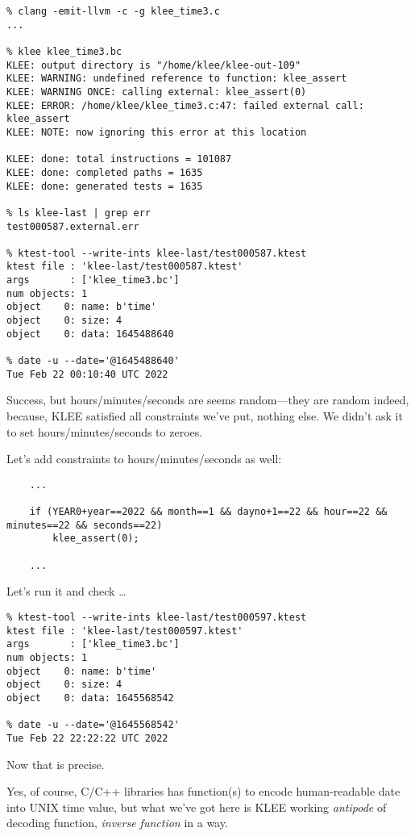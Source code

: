 

\begin{lstlisting}
% clang -emit-llvm -c -g klee_time3.c
...

% klee klee_time3.bc
KLEE: output directory is "/home/klee/klee-out-109"
KLEE: WARNING: undefined reference to function: klee_assert
KLEE: WARNING ONCE: calling external: klee_assert(0)
KLEE: ERROR: /home/klee/klee_time3.c:47: failed external call: klee_assert
KLEE: NOTE: now ignoring this error at this location

KLEE: done: total instructions = 101087
KLEE: done: completed paths = 1635
KLEE: done: generated tests = 1635

% ls klee-last | grep err
test000587.external.err

% ktest-tool --write-ints klee-last/test000587.ktest
ktest file : 'klee-last/test000587.ktest'
args       : ['klee_time3.bc']
num objects: 1
object    0: name: b'time'
object    0: size: 4
object    0: data: 1645488640

% date -u --date='@1645488640'
Tue Feb 22 00:10:40 UTC 2022
\end{lstlisting}

Success, but hours/minutes/seconds are seems random---they are random indeed, because, KLEE satisfied all constraints we've put, nothing else.
We didn't ask it to set hours/minutes/seconds to zeroes.

Let's add constraints to hours/minutes/seconds as well:

\begin{lstlisting}
	...

	if (YEAR0+year==2022 && month==1 && dayno+1==22 && hour==22 && minutes==22 && seconds==22)
		klee_assert(0);
	
	...
\end{lstlisting}

Let's run it and check \dots

\begin{lstlisting}
% ktest-tool --write-ints klee-last/test000597.ktest
ktest file : 'klee-last/test000597.ktest'
args       : ['klee_time3.bc']
num objects: 1
object    0: name: b'time'
object    0: size: 4
object    0: data: 1645568542

% date -u --date='@1645568542'
Tue Feb 22 22:22:22 UTC 2022
\end{lstlisting}

Now that is precise.

Yes, of course, C/C++ libraries has function(s) to encode human-readable date into UNIX time value, but what we've got here is KLEE working
\emph{antipode} of decoding function, \emph{inverse function} in a way.

